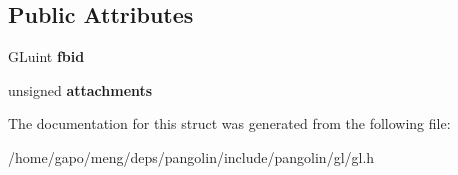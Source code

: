 \subsection*{Public Attributes}
\begin{DoxyCompactItemize}
\item 
G\+Luint {\bfseries fbid}\hypertarget{structpangolin_1_1_gl_framebuffer_a4716681c2d155b1681aaac275f0bfd8c}{}\label{structpangolin_1_1_gl_framebuffer_a4716681c2d155b1681aaac275f0bfd8c}

\item 
unsigned {\bfseries attachments}\hypertarget{structpangolin_1_1_gl_framebuffer_af469e2f0bcfc08786a52e2a3b31045c7}{}\label{structpangolin_1_1_gl_framebuffer_af469e2f0bcfc08786a52e2a3b31045c7}

\end{DoxyCompactItemize}


The documentation for this struct was generated from the following file\+:\begin{DoxyCompactItemize}
\item 
/home/gapo/meng/deps/pangolin/include/pangolin/gl/gl.\+h\end{DoxyCompactItemize}
